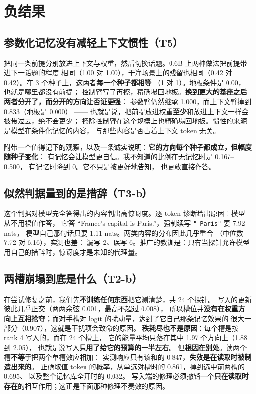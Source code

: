 \documentclass[11pt]{ctexart}
\begin{document}
\section{负结果}
\label{sec:neg}

\subsection{参数化记忆没有减轻上下文惯性（T5）}
把同一条前提分别放进上下文与权重，然后切换话题。0.6B 上两种做法把前提带进下一话题的程度
相同（1.00 对 1.00），干净场景上的残留也相同（0.42 对
0.42）。在 3 个种子上，这两者\textbf{每一个种子都相等}
（1 对 1）。地板条件是 0.00，也就是哪里都没有前提；
控制臂写了再擦，精确塌回地板。\textbf{换到更大的基座之后两者分开了，而分开的方向让否证更强}：
参数臂仍然继承 1.000，而上下文臂掉到 0.833（地板是 0.000）
—— 也就是说，把前提放进权重\textbf{至少}和放进上下文一样会被带过去，绝不会更少；
擦除控制臂在这个规模上也精确塌回地板。惯性的来源是模型在条件化记忆的内容，
与那些内容是否占着上下文 token 无关。

附带一个值得记下的观察，以及一条诚实说明：\textbf{它的方向每个种子都成立，但幅度随种子变化}：
有记忆会让模型更自信。我不知道的比例在无记忆时是 0.167--0.500，
有记忆时降到 0。它不只是被更好地告知，
也更敢直接作答。

\subsection{似然判据量到的是措辞（T3-b）}
这个判据对模型完全答得出的内容判出高惊讶度。逐 token 诊断给出原因：模型从不用裸值作答，
它答 “France's capital is Paris.”，强制续写 \texttt{" Paris"} 要 7.92 nats，
模型自己那句话只要 1.11 nats。两类内容的分布因此几乎重合
（中位数 7.72 对 6.16），实测也差：
漏写 2、误写 6。推广的教训是：只有当探针允许模型
用自己的措辞时，惊讶度才是未知的代理量。

\subsection{两槽崩塌到底是什么（T2-b）}
在尝试修复之前，我们先\textbf{不训练任何东西}把它测清楚，共 24 个探针。
写入的更新彼此几乎正交（两两余弦 0.001，最高不超过 0.008），
所以槽位并\textbf{没有在权重方向上互相抢夺}；而对手槽对 logit 的扰动量，达到了它自己那条记忆效果的
很大一部分（0.907），这就是干扰项会致命的原因。
\textbf{秩耗尽也不是原因}：每个槽是按 rank 4 写入的，而在 24 个槽上，
它的能量平均只落在其中 1.97 个方向上（1.88 到 2.05），
也就是说写入\textbf{只用了给它的预算的一半左右}。
但\textbf{根因在别处}。读两个槽\textbf{不等于}把两个单槽效应相加：
实测响应只有该和的 0.847，\textbf{失效是在读取时被制造出来的}。
正确取值 token 的概率，从单选对槽时的 0.861，掉到选中前两槽的 0.695、
以及整个记忆库全开时的 0.032。
写入端的修理必须撤销一个\textbf{只在读取时存在}的相互作用；这正是下面那种修理不奏效的原因。
\end{document}
